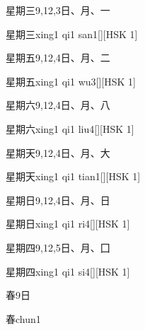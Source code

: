 \begin{entry}{星期三}{9,12,3}{⽇、⽉、⼀}
  \begin{phonetics}{星期三}{xing1 qi1 san1}[][HSK 1]
  \end{phonetics}
\end{entry}

\begin{entry}{星期五}{9,12,4}{⽇、⽉、⼆}
  \begin{phonetics}{星期五}{xing1 qi1 wu3}[][HSK 1]
  \end{phonetics}
\end{entry}

\begin{entry}{星期六}{9,12,4}{⽇、⽉、⼋}
  \begin{phonetics}{星期六}{xing1 qi1 liu4}[][HSK 1]
  \end{phonetics}
\end{entry}

\begin{entry}{星期天}{9,12,4}{⽇、⽉、⼤}
  \begin{phonetics}{星期天}{xing1 qi1 tian1}[][HSK 1]
  \end{phonetics}
\end{entry}

\begin{entry}{星期日}{9,12,4}{⽇、⽉、⽇}
  \begin{phonetics}{星期日}{xing1 qi1 ri4}[][HSK 1]
  \end{phonetics}
\end{entry}

\begin{entry}{星期四}{9,12,5}{⽇、⽉、⼞}
  \begin{phonetics}{星期四}{xing1 qi1 si4}[][HSK 1]
  \end{phonetics}
\end{entry}

\begin{entry}{春}{9}{⽇}
  \begin{phonetics}{春}{chun1}
  \end{phonetics}
\end{entry}

